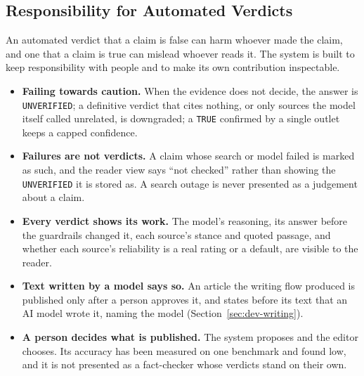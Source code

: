 
\subsection{Responsibility for Automated Verdicts}

An automated verdict that a claim is false can harm whoever made the
claim, and one that a claim is true can mislead whoever reads it. The
system is built to keep responsibility with people and to make its own
contribution inspectable.

\begin{itemize}
    \item \textbf{Failing towards caution.} When the evidence does not
    decide, the answer is \texttt{UNVERIFIED}; a definitive verdict that
    cites nothing, or only sources the model itself called unrelated, is
    downgraded; a \texttt{TRUE} confirmed by a single outlet keeps a
    capped confidence.
    \item \textbf{Failures are not verdicts.} A claim whose search or
    model failed is marked as such, and the reader view says ``not
    checked'' rather than showing the \texttt{UNVERIFIED} it is stored
    as. A search outage is never presented as a judgement about a claim.
    \item \textbf{Every verdict shows its work.} The model's reasoning,
    its answer before the guardrails changed it, each source's stance and
    quoted passage, and whether each source's reliability is a real
    rating or a default, are visible to the reader.
    \item \textbf{Text written by a model says so.} An article the
    writing flow produced is published only after a person approves it,
    and states before its text that an AI model wrote it, naming the
    model (Section~\ref{sec:dev-writing}).
    \item \textbf{A person decides what is published.} The system
    proposes and the editor chooses. Its accuracy has been measured on
    one benchmark and found low, and it is not presented as a
    fact-checker whose verdicts stand on their own.
\end{itemize}

